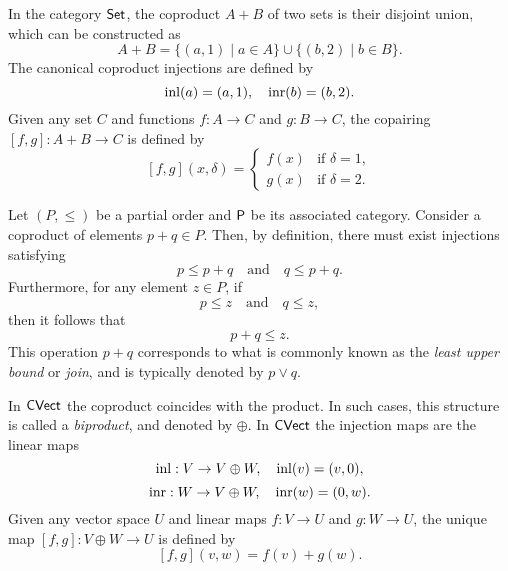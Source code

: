 \begin{example}
  In the category $\mathsf{Set}$, the coproduct \( A + B \) of two sets is their disjoint union, which can be constructed as
\[
A + B = \{(a, 1) \mid a \in A\} \cup \{(b, 2) \mid b \in B\}.
\]
The canonical coproduct injections are defined by
\[
\mathrm{inl}(a) = (a, 1), \quad \mathrm{inr}(b) = (b, 2).
\]
Given any set \(C\) and functions \(f: A \to C\) and \(g: B \to C\), the copairing \([f, g]: A + B \to C\) is defined by
\[
[f, g](x, \delta) = 
\begin{cases}
f(x) & \text{if } \delta = 1, \\
g(x) & \text{if } \delta = 2.
\end{cases}
\]
\end{example}

\begin{example}
  Let $(P, \leq)$ be a partial order and $\mathsf{P}$ be its associated category.  
Consider a coproduct of elements \( p + q \in P \). Then, by definition, there must exist injections satisfying
\[
p \leq p + q \quad \text{and} \quad q \leq p + q.
\]
Furthermore, for any element \( z \in P \), if
\[
p \leq z \quad \text{and} \quad q \leq z,
\]
then it follows that
\[
p + q \leq z.
\]
This operation \( p + q \) corresponds to what is commonly known as the \emph{least upper bound} or \emph{join}, and is typically denoted by \( p \vee q \).
\end{example}


\begin{example}
  In $\mathsf{CVect}$ the coproduct coincides with the product. In such cases, this structure is called a \emph{biproduct}, and denoted by $\oplus$. 
  In  $\mathsf{CVect}$ the injection maps are the linear maps
\[
\mathrm{inl}: V \to  V \oplus W, \quad  \mathrm{inl}(v)= (v,0),
\]
\[
\mathrm{inr} : W \to V \oplus W, \quad \mathrm{inr}(w) = (0,w).
\]
Given any vector space $U$ and linear maps $f: V \to U$ and $g: W \to U$, the unique map $[ f, g] : V \oplus W \to U$
is defined by
\[
[f, g] (v,w) = f(v)+ g(w).
\]
\end{example}


